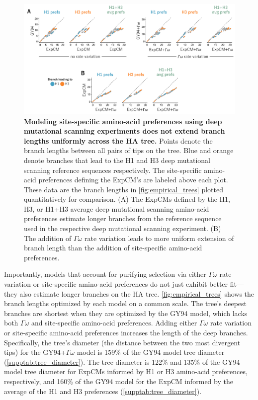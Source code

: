 \documentclass[11pt]{article}
\begin{document}
\begin{figure}
\centerline{\includegraphics[width=\textwidth]{figures/empirical_scatter.pdf}}
\caption{\label{fig:empirical_scatter}
\textbf{Modeling site-specific amino-acid preferences using deep mutational scanning experiments does not extend branch lengths uniformly across the HA tree.}
Points denote the branch lengths between all pairs of tips on the tree. 
Blue and orange denote branches that lead to the H1 and H3 deep mutational scanning reference sequences respectively. 
The site-specific amino-acid preferences defining the ExpCM's are labeled above each plot.
These data are the branch lengths in \ref{fig:empirical_trees} plotted quantitatively for comparison.
(A) The ExpCMs defined by the H1, H3, or H1+H3 average deep mutational scanning amino-acid preferences estimate longer branches from the reference sequence used in the respective deep mutational scanning experiment. 
(B) The addition of $\Gamma\omega$ rate variation leads to more uniform extension of branch length than the addition of site-specific amino-acid preferences.
}
\end{figure}

Importantly, models that account for purifying selection via either $\Gamma\omega$ rate variation or site-specific amino-acid preferences do not just exhibit better fit---they also estimate longer branches on the HA tree. 
\ref{fig:empirical_trees} shows the branch lengths optimized by each model on a common scale.
The tree's deepest branches are shortest when they are optimized by the GY94 model, which lacks both $\Gamma\omega$ and site-specific amino-acid preferences.
Adding either $\Gamma\omega$ rate variation or site-specific amino-acid preferences increases the length of the deep branches.
Specifically, the tree's diameter (the distance between the two most divergent tips) for the GY94+$\Gamma\omega$ model is 159\% of the GY94 model tree diameter (\ref{supptab:tree_diameter}).
The tree diameter is 122\% and 135\% of the GY94 model tree diameter for ExpCMs informed by H1 or H3 amino-acid preferences, respectively, and 160\% of the GY94 model for the ExpCM informed by the average of the H1 and H3 preferences (\ref{supptab:tree_diameter}).
\end{document}
